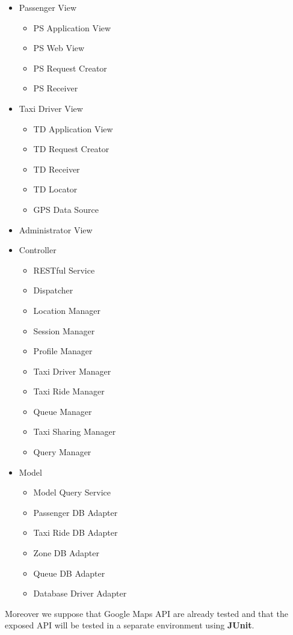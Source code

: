 \begin{itemize}
	\item Passenger View
	\begin{itemize}
		\item PS Application View
		\item PS Web View
		\item PS Request Creator
		\item PS Receiver
	\end{itemize}
	\item Taxi Driver View
	\begin{itemize}
		\item TD Application View
		\item TD Request Creator
		\item TD Receiver
		\item TD Locator
		\item GPS Data Source
	\end{itemize}
	\item Administrator View
	\item Controller
	\begin{itemize}
		\item RESTful Service
		\item Dispatcher
		\item Location Manager
		\item Session Manager
		\item Profile Manager
		\item Taxi Driver Manager
		\item Taxi Ride Manager
		\item Queue Manager
		\item Taxi Sharing Manager
		\item Query Manager
	\end{itemize}
	\item Model
	\begin{itemize}
		\item Model Query Service
		\item Passenger DB Adapter
		\item Taxi Ride DB Adapter
		\item Zone DB Adapter
		\item Queue DB Adapter
		\item Database Driver Adapter
	\end{itemize}
\end{itemize}
Moreover we suppose that Google Maps API are already tested and that the exposed API will be tested in a separate environment using \textbf{JUnit}.


